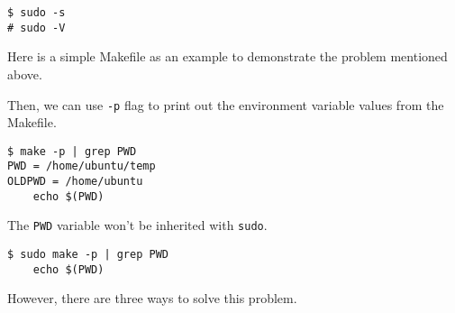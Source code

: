 \documentclass[10pt, oneside]{book}
\begin{document}
\begin{verbatim}
$ sudo -s
# sudo -V
\end{verbatim}

Here is a simple Makefile as an example to demonstrate the problem mentioned above.


Then, we can use \verb|-p| flag to print out the environment variable values from the Makefile.

\begin{verbatim}
$ make -p | grep PWD
PWD = /home/ubuntu/temp
OLDPWD = /home/ubuntu
	echo $(PWD)
\end{verbatim}

The \verb|PWD| variable won't be inherited with \verb|sudo|.

\begin{verbatim}
$ sudo make -p | grep PWD
	echo $(PWD)
\end{verbatim}

However, there are three ways to solve this problem.
\end{document}
